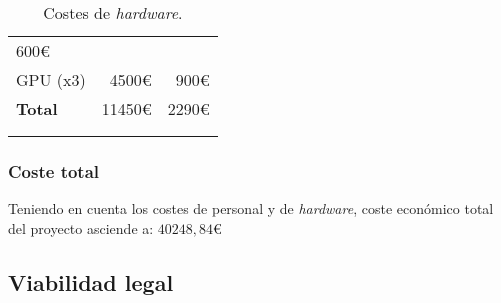 \begin{longtable}[]{@{}lrr@{}}
\begin{minipage}[t]{0.32\columnwidth}
		600\euro{}\strut
	\end{minipage}\tabularnewline
	\begin{minipage}[t]{0.29\columnwidth}\raggedright\strut
		GPU (x3)\strut
	\end{minipage} & \begin{minipage}[t]{0.18\columnwidth}\raggedright\strut
		4500\euro{}\strut
	\end{minipage} & \begin{minipage}[t]{0.32\columnwidth}\raggedright\strut
		900\euro{}\strut
	\end{minipage}\tabularnewline
	\midrule
	\begin{minipage}[t]{0.29\columnwidth}\raggedright\strut
		\textbf{Total}\strut
	\end{minipage} & \begin{minipage}[t]{0.18\columnwidth}\raggedright\strut
		11450\euro{}\strut
	\end{minipage} & \begin{minipage}[t]{0.32\columnwidth}\raggedright\strut
		2290\euro{}\strut
	\end{minipage}\tabularnewline
	\bottomrule
	\\
	\caption{Costes de \emph{hardware}.}
\end{longtable}

\subsubsection{Coste total}

Teniendo en cuenta los costes de personal y de \textit{hardware}, coste económico total del proyecto asciende a: $40248,84$\euro


\subsection{Viabilidad legal}


